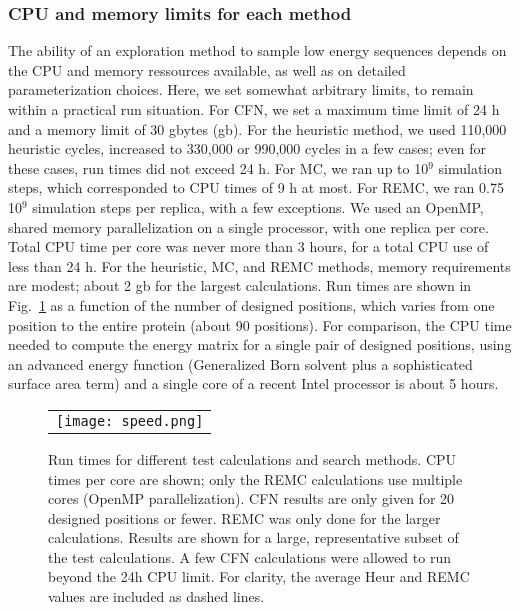 \subsubsection{CPU and memory limits for each method}
\label{BESTprotocol}
The ability of an exploration method to sample low energy sequences depends on the CPU and memory ressources available, as well as on detailed parameterization choices. Here, we set somewhat arbitrary limits, to remain within a practical run situation. For CFN, we set a maximum time limit of 24 h and a memory limit of 30 gbytes (gb). For the heuristic method, we used 110,000 heuristic cycles, increased to 330,000 or 990,000 cycles in a few cases; even for these cases, run times did not exceed 24 h. For MC, we ran up to 10$^9$ simulation steps, which corresponded to CPU times of 9 h at most. For REMC, we ran 0.75 10$^9$ simulation steps per replica, with a few exceptions. We used an OpenMP, shared memory parallelization on a single processor, with one replica per core. Total CPU time per core was never more than 3 hours, for a total CPU use of less than 24 h. For the heuristic, MC, and REMC methods, memory requirements are modest; about 2 gb for the largest calculations. Run times are shown in Fig.\ \ref{fig:cpu} as a function of the number of designed positions, which varies from one position to the entire protein (about 90 positions). For comparison, the CPU time needed to compute the energy matrix for a single pair of designed positions, using an advanced energy function (Generalized Born solvent plus a sophisticated surface area term) and a single core of a recent Intel processor is about 5 hours.


    \begin{figure}[!htbp]
      \centering
      \begin{tabular}{c}
        \texttt{[image: speed.png]} 
      \end{tabular}
      \caption{\small 
Run times for different test calculations and search methods. CPU times per core are shown; only the REMC calculations use multiple cores (OpenMP parallelization). CFN results are only given for 20 designed positions or fewer. REMC was only done for the larger calculations. Results are shown for a large, representative subset of the test calculations. A few CFN calculations were allowed to run beyond the 24h CPU limit. For clarity, the average Heur and REMC values are included as dashed lines.
}

      \label{fig:cpu}
    \end{figure}



